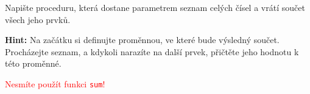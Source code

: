 \question[50]
Napište proceduru, která dostane parametrem seznam celých čísel a vrátí součet
všech jeho prvků.

\textbf{Hint:} Na začátku si definujte proměnnou, ve které bude výsledný součet.
Procházejte seznam, a kdykoli narazíte na další prvek, přičtěte jeho hodnotu k
této proměnné.

\textcolor{red}{Nesmíte použít funkci \texttt{sum}!}